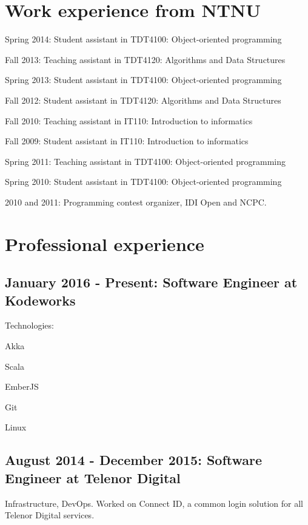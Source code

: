 \documentclass[letterpaper]{article}
\renewenvironment{itemize}{
  \begin{list}{}{
    \setlength{\leftmargin}{1.5em}
  }
}{
  \end{list}
}
\begin{document}
\section*{Work experience from NTNU}
\begin{itemize}
\item Spring 2014: Student assistant in TDT4100: Object-oriented programming
\item Fall 2013: Teaching assistant in TDT4120: Algorithms and Data
  Structures
\item Spring 2013: Student assistant in TDT4100: Object-oriented programming
\item Fall 2012: Student assistant in TDT4120: Algorithms and Data Structures

\item Fall 2010: Teaching assistant in IT110: Introduction to informatics
\item Fall 2009: Student assistant in  IT110: Introduction to informatics

\item Spring 2011: Teaching assistant in  TDT4100: Object-oriented programming
\item Spring 2010: Student assistant in  TDT4100: Object-oriented programming

\item 2010 and 2011: Programming contest organizer, IDI Open and NCPC.
\end{itemize}

\section*{Professional experience}
\subsection*{January 2016 - Present: Software Engineer at Kodeworks}
Technologies:
\begin{itemize}
\item Akka
\item Scala
\item EmberJS
\item Git
\item Linux
\end{itemize}

\subsection*{August 2014 - December 2015: Software Engineer at Telenor Digital}
Infrastructure, DevOps. Worked on Connect ID, a common login solution for all Telenor Digital services.
\end{document}
